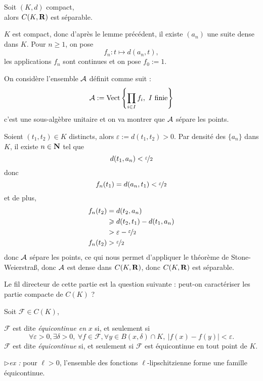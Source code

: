 \documentclass[a4paper,11pt, twoside]{article}
\begin{document}
\begin{lemme}
  Soit $(K,d)$ compact,\\

  alors $C(K,\mathbf R)$ est séparable.
\end{lemme}

\begin{Proof}
  $K$ est compact, donc d'après le lemme précédent, il existe $(a_n)$ une suite dense dans $K$. Pour $n\geqslant 1$, on pose 
  $$f_n:t\longmapsto d(a_n,t),$$
  les applications $f_n$ sont continues et on pose $f_0:=1$.

  On considère l'ensemble $\mathcal A$ définit comme suit :
  $$\mathcal A:=\mathrm{Vect}\left\{\prod_{i\in I}f_i,\ I\text{ finie}\right\}$$
  c'est une sous-algèbre unitaire et on va montrer que $\mathcal A$ sépare les points.

  Soient $(t_1,t_2)\in K$ distincts, alors $\varepsilon:=d(t_1,t_2)>0$. Par densité des $\{a_n\}$ dans $K$, il existe $n\in\mathbf N$ tel que 
  $$d(t_1,a_n)<\nicefrac{\varepsilon}{2}$$
  donc 
  $$f_n(t_1)=d(a_n,t_1)<\nicefrac{\varepsilon}{2}$$
  et de plus,
  \begin{align*}
    f_n(t_2)&=d(t_2,a_n)\\
    &\geqslant d(t_2,t_1)-d(t_1,a_n)\\
    &>\varepsilon-\nicefrac{\varepsilon}{2}\\
    f_n(t_2)&>\nicefrac{\varepsilon}{2}
  \end{align*}
  donc $\mathcal A$ sépare les points, ce qui nous permet d'appliquer le théorème de Stone-Weierstra\ss, donc $\mathcal A$ est dense dans $C(K,\mathbf R)$, donc $C(K,\mathbf R)$ est séparable.
\end{Proof}





Le fil directeur de cette partie est la question suivante : peut-on caractériser les partie compacte de $C(K)$ ?


\begin{Def}
  Soit $\mathcal F\in C(K)$,

  $\mathcal F$ est dite \emph{équicontinue en }$x$ si, et seulement si
  $$\forall \varepsilon>0, \exists\delta>0,\ \forall f\in\mathcal F, \forall y\in B(x,\delta)\cap K,\ |f(x)-f(y)|<\varepsilon.$$
  $\mathcal F$ est dite \emph{équicontinue} si, et seulement si $\mathcal F$ est équicontinue en tout point de $K$.
\end{Def}

$\triangleright$\emph{ex : }pour $\ell>0$, l'ensemble des fonctions $\ell$-lipschitzienne forme une famille équicontinue.
\end{document}
